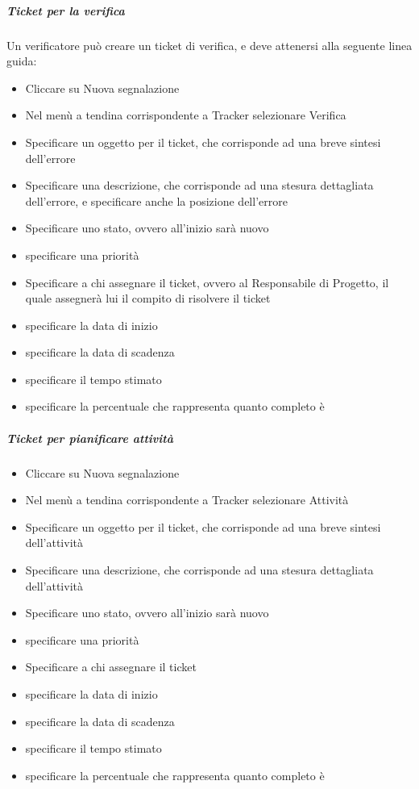 \subparagraph{Ticket per la verifica \\}
Un verificatore può creare un ticket di verifica, e deve attenersi alla seguente linea guida:
\begin{itemize}
\item Cliccare su Nuova segnalazione
\item Nel menù a tendina corrispondente a Tracker selezionare Verifica
\item Specificare un oggetto per il ticket, che corrisponde ad una breve sintesi dell'errore
\item Specificare una descrizione, che corrisponde ad una stesura dettagliata dell'errore, e specificare anche la posizione dell'errore
\item Specificare uno stato, ovvero all'inizio sarà nuovo
\item specificare una priorità
\item Specificare a chi assegnare il ticket, ovvero al Responsabile di Progetto, il quale assegnerà lui il compito di risolvere il ticket
\item specificare la data di inizio
\item specificare la data di scadenza
\item specificare il tempo stimato
\item specificare la percentuale che rappresenta quanto completo è
\end{itemize}

\subparagraph{Ticket per pianificare attività \\}
\begin{itemize}
\item Cliccare su Nuova segnalazione
\item Nel menù a tendina corrispondente a Tracker selezionare Attività
\item Specificare un oggetto per il ticket, che corrisponde ad una breve sintesi dell'attività
\item Specificare una descrizione, che corrisponde ad una stesura dettagliata dell'attività
\item Specificare uno stato, ovvero all'inizio sarà nuovo
\item specificare una priorità
\item Specificare a chi assegnare il ticket
\item specificare la data di inizio
\item specificare la data di scadenza
\item specificare il tempo stimato
\item specificare la percentuale che rappresenta quanto completo è
\end{itemize}

